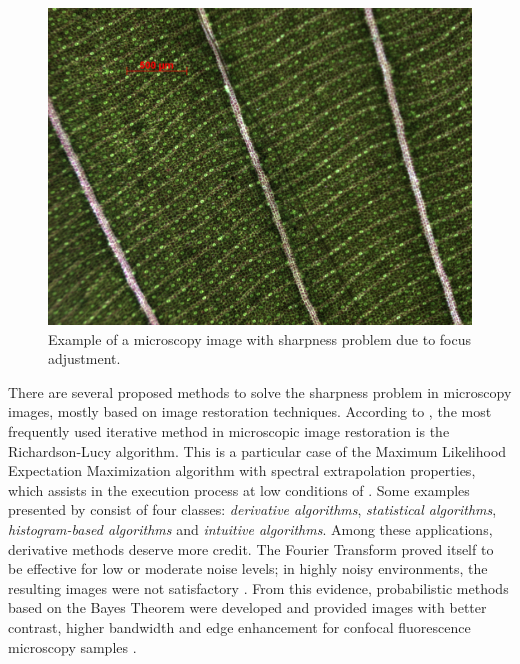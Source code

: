 \begin{figure}[htb]
	\centering
	\caption{\label{fig:ctenanthe}Example of a microscopy image with sharpness problem due to focus adjustment.}
	\begin{center}
	    \includegraphics[scale=0.3]
			{images/fig1.png}
	\end{center}
	\centering
	\fautor
\end{figure}

There are several proposed methods to solve the sharpness problem in microscopy images, mostly based on image restoration techniques. According to , the most frequently used iterative method in microscopic image restoration is the Richardson-Lucy algorithm. This is a particular case of the Maximum Likelihood Expectation Maximization algorithm with spectral extrapolation properties, which assists in the execution process at low conditions of . Some examples presented by \cite{sun2005autofocusing} consist of
four classes: \emph{derivative algorithms}, \emph{statistical algorithms}, \emph{histogram-based algorithms} and \emph{intuitive algorithms}. Among these applications, derivative methods deserve more credit. The Fourier Transform proved itself to be
effective for low or moderate noise levels; in highly noisy environments, the resulting images were not satisfactory \cite{richardson1972bayesian}. From this evidence, probabilistic methods based on the Bayes Theorem were developed and provided images with better contrast, higher bandwidth and
edge enhancement for confocal fluorescence microscopy samples \cite{ponti2016image}.

